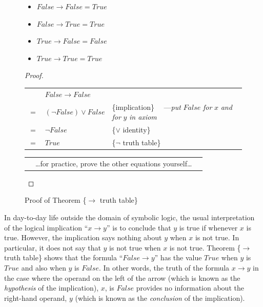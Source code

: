 \begin{figure}
\begin{theorem}
\mbox{}
\begin{itemize}
\item $False \rightarrow False = True$
\item $False \rightarrow True  = True$
\item $True  \rightarrow False = False$
\item $True  \rightarrow True  = True$
\end{itemize}
\end{theorem}

\begin{proof}
\mbox{} \\
\begin{tabular}{llp{3.15in}}
    & $False \rightarrow False$        & \\
$=$ & $(\neg False) \vee False$        & \{implication\} ~~---\emph{put} $False$ \emph{for} $x$ \emph{and for} $y$ \emph{in axiom}\\
$=$ & $\neg False$                     & \{$\vee$ identity\}\\
$=$ & $True$                           & \{$\neg$ truth table\}\\
\end{tabular}

\begin{tabular}{lll}
& \dots for practice, prove the other equations yourself\dots & \\
\end{tabular}

\end{proof}
\caption{Proof of Theorem \{$\rightarrow$ truth table\}}
\label{implication-truth-table}
\end{figure}

In day-to-day life outside the domain of symbolic logic,
the usual interpretation of the logical implication ``$x \rightarrow y$''
is to conclude that $y$ is true if whenever
$x$ is true. However, the implication says nothing
about $y$ when $x$ is not true. In particular, it
does not say that $y$ is not true when $x$ is not true.
Theorem \{$\rightarrow$ truth table\} shows that the
formula ``$False \rightarrow y$'' has the value $True$ when $y$ is $True$
and also when $y$ is $False$.
In other words, the truth of the formula $x \rightarrow y$ in the case
where the operand on the left of the arrow (which is known as the
\emph{hypothesis}
of the implication), $x$, is $False$ provides
no information about the right-hand operand, $y$ (which is known as the
\emph{conclusion}
of the implication).

